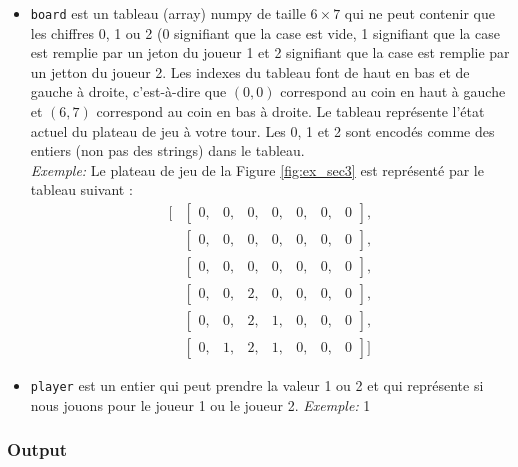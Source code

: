 \documentclass[11pt,answers]{exam}
\begin{document}
\begin{itemize}
	\item \texttt{board} est un tableau (array) numpy de taille $6 \times 7$ qui ne peut contenir que les chiffres 0, 1 ou 2 (0 signifiant que la case est vide, 1 signifiant que la case est remplie par un jeton du joueur 1 et 2 signifiant que la case est remplie par un jetton du joueur 2. Les indexes du tableau font de haut en bas et de gauche à droite, c'est-à-dire que $(0,0)$ correspond au coin en haut à gauche et $(6,7)$ correspond au coin en bas à droite.
	Le tableau représente l'état actuel du plateau de jeu à votre tour. Les 0, 1 et 2 sont encodés comme des entiers (non pas des strings) dans le tableau.\\
	\emph{Exemple:} Le plateau de jeu de la Figure \ref{fig:ex_sec3} est représenté par le tableau suivant :
\begin{align*}
    \Bigg[ &\begin{bmatrix} 0, & 0, & 0, & 0, & 0, & 0, & 0 \end{bmatrix}, \\
    &\begin{bmatrix} 0, & 0, & 0, & 0, & 0, & 0, & 0 \end{bmatrix}, \\
    &\begin{bmatrix} 0, & 0, & 0, & 0, & 0, & 0, & 0 \end{bmatrix}, \\
    &\begin{bmatrix} 0, & 0, & 2, & 0, & 0, & 0, & 0 \end{bmatrix}, \\
    &\begin{bmatrix} 0, & 0, & 2, & 1, & 0, & 0, & 0 \end{bmatrix}, \\
    &\begin{bmatrix} 0, & 1, & 2, & 1, & 0, & 0, & 0 \end{bmatrix} \Bigg]
\end{align*}

	\item \texttt{player} est un entier qui peut prendre la valeur 1 ou 2 et qui représente si nous jouons pour le joueur 1 ou le joueur 2. \emph{Exemple:} 1
\end{itemize}



\subsubsection*{Output}
\end{document}
